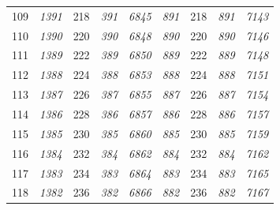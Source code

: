 \documentclass[10pt,fleqn]{article}
\begin{document}
\begin{longtable}{c|cccccccc}
109 & {\color{blue} \it 1391 \rm} & {\color{black} 218} & {\color{blue} \it 391 \rm} & {\color{blue} \it 6845 \rm} & {\color{blue} \it 891 \rm} & {\color{black} 218} & {\color{blue} \it 891 \rm} & {\color{blue} \it 7143 \rm} \\
110 & {\color{blue} \it 1390 \rm} & {\color{black} 220} & {\color{blue} \it 390 \rm} & {\color{blue} \it 6848 \rm} & {\color{blue} \it 890 \rm} & {\color{black} 220} & {\color{blue} \it 890 \rm} & {\color{blue} \it 7146 \rm} \\
111 & {\color{blue} \it 1389 \rm} & {\color{black} 222} & {\color{blue} \it 389 \rm} & {\color{blue} \it 6850 \rm} & {\color{blue} \it 889 \rm} & {\color{black} 222} & {\color{blue} \it 889 \rm} & {\color{blue} \it 7148 \rm} \\
112 & {\color{blue} \it 1388 \rm} & {\color{black} 224} & {\color{blue} \it 388 \rm} & {\color{blue} \it 6853 \rm} & {\color{blue} \it 888 \rm} & {\color{black} 224} & {\color{blue} \it 888 \rm} & {\color{blue} \it 7151 \rm} \\
113 & {\color{blue} \it 1387 \rm} & {\color{black} 226} & {\color{blue} \it 387 \rm} & {\color{blue} \it 6855 \rm} & {\color{blue} \it 887 \rm} & {\color{black} 226} & {\color{blue} \it 887 \rm} & {\color{blue} \it 7154 \rm} \\
114 & {\color{blue} \it 1386 \rm} & {\color{black} 228} & {\color{blue} \it 386 \rm} & {\color{blue} \it 6857 \rm} & {\color{blue} \it 886 \rm} & {\color{black} 228} & {\color{blue} \it 886 \rm} & {\color{blue} \it 7157 \rm} \\
115 & {\color{blue} \it 1385 \rm} & {\color{black} 230} & {\color{blue} \it 385 \rm} & {\color{blue} \it 6860 \rm} & {\color{blue} \it 885 \rm} & {\color{black} 230} & {\color{blue} \it 885 \rm} & {\color{blue} \it 7159 \rm} \\
116 & {\color{blue} \it 1384 \rm} & {\color{black} 232} & {\color{blue} \it 384 \rm} & {\color{blue} \it 6862 \rm} & {\color{blue} \it 884 \rm} & {\color{black} 232} & {\color{blue} \it 884 \rm} & {\color{blue} \it 7162 \rm} \\
117 & {\color{blue} \it 1383 \rm} & {\color{black} 234} & {\color{blue} \it 383 \rm} & {\color{blue} \it 6864 \rm} & {\color{blue} \it 883 \rm} & {\color{black} 234} & {\color{blue} \it 883 \rm} & {\color{blue} \it 7165 \rm} \\
118 & {\color{blue} \it 1382 \rm} & {\color{black} 236} & {\color{blue} \it 382 \rm} & {\color{blue} \it 6866 \rm} & {\color{blue} \it 882 \rm} & {\color{black} 236} & {\color{blue} \it 882 \rm} & {\color{blue} \it 7167 \rm} \\

\end{longtable}
\end{document}
